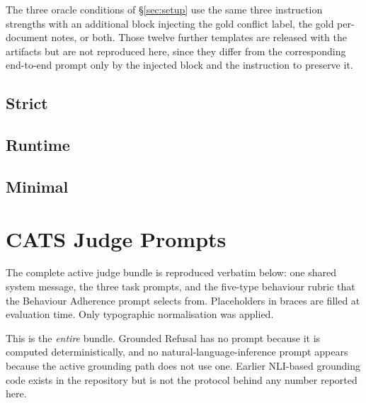 The three oracle conditions of \S\ref{sec:setup} use the same three instruction
strengths with an additional block injecting the gold conflict label, the gold
per-document notes, or both. Those twelve further templates are released with the
artifacts but are not reproduced here, since they differ from the corresponding
end-to-end prompt only by the injected block and the instruction to preserve it.

\subsection{Strict}

\subsection{Runtime}

\subsection{Minimal}

\FloatBarrier

\section{CATS Judge Prompts}
\label{app:catsprompts}

The complete active judge bundle is reproduced verbatim below: one shared system
message, the three task prompts, and the five-type behaviour rubric that the
Behaviour Adherence prompt selects from. Placeholders in braces are filled at
evaluation time. Only typographic normalisation was applied.

This is the \emph{entire} bundle. Grounded Refusal has no prompt because it is
computed deterministically, and no natural-language-inference prompt appears
because the active grounding path does not use one. Earlier NLI-based grounding
code exists in the repository but is not the protocol behind any number reported
here.

